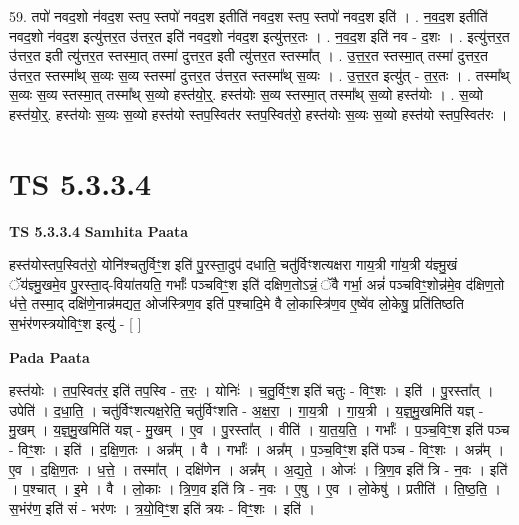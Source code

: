 \documentclass[17pt]{extarticle}
\begin{document}
59. तपो॑ नवद॒शो न॑वद॒श स्तप॒ स्तपो॑ नवद॒श इतीति॑ नवद॒श स्तप॒ स्तपो॑ नवद॒श इति॑ । . न॒व॒द॒श इतीति॑ नवद॒शो न॑वद॒श इत्यु॑त्तर॒त उ॑त्तर॒त इति॑ नवद॒शो न॑वद॒श इत्यु॑त्तर॒तः । . न॒व॒द॒श इति॑ नव - द॒शः । . इत्यु॑त्तर॒त उ॑त्तर॒त इती त्यु॑त्तर॒त स्तस्मा॒त् तस्मा॑ दुत्तर॒त इती त्यु॑त्तर॒त स्तस्मा᳚त् । . उ॒त्त॒र॒त स्तस्मा॒त् तस्मा॑ दुत्तर॒त उ॑त्तर॒त स्तस्मा᳚थ् स॒व्यः स॒व्य स्तस्मा॑ दुत्तर॒त उ॑त्तर॒त स्तस्मा᳚थ् स॒व्यः । . उ॒त्त॒र॒त इत्यु॑त् - त॒र॒तः । . तस्मा᳚थ् स॒व्यः स॒व्य स्तस्मा॒त् तस्मा᳚थ् स॒व्यो हस्त॑यो॒र्॒. हस्त॑योः स॒व्य स्तस्मा॒त् तस्मा᳚थ् स॒व्यो हस्त॑योः । . स॒व्यो हस्त॑यो॒र्॒. हस्त॑योः स॒व्यः स॒व्यो हस्त॑यो स्तप॒स्वित॑र स्तप॒स्वित॑रो॒ हस्त॑योः स॒व्यः स॒व्यो हस्त॑यो स्तप॒स्वित॑रः । \newline
\pagebreak
{}

\section{ TS 5.3.3.4 }

\textbf{TS 5.3.3.4 } \newline
\textbf{Samhita Paata} \newline

हस्त॑योस्तप॒स्वित॑रो॒ योनि॑श्चतुर्विꣳ॒॒श इति॑ पु॒रस्ता॒दुप॑ दधाति॒ चतु॑र्विꣳशत्यक्षरा गाय॒त्री गा॑य॒त्री य॑ज्ञ्मु॒खं ॅय॑ज्ञ्मु॒खमे॒व पु॒रस्ता॒द्-विया॑तयति॒ गर्भाः᳚ पञ्चविꣳ॒॒श इति॑ दक्षिण॒तोऽन्नं॒ ॅवै गर्भा॒ अन्नं॑ पञ्चविꣳ॒॒शोन्न॑मे॒व द॑क्षिण॒तो ध॑त्ते॒ तस्मा॒द् दक्षि॑णे॒नान्न॑मद्यत॒ ओज॑स्त्रिण॒व इति॑ प॒श्चादि॒मे वै लो॒कास्त्रि॑ण॒व ए॒ष्वे॑व लो॒केषु॒ प्रति॑तिष्ठति स॒भंर॑णस्त्रयोविꣳ॒॒श इत्यु॑ - [  ] \newline

\textbf{Pada Paata} \newline

हस्त॑योः । त॒प॒स्वित॑र॒ इति॑ तप॒स्वि - त॒रः॒ । योनिः॑ । च॒तु॒र्विꣳ॒॒श इति॑ चतुः - विꣳ॒॒शः । इति॑ । पु॒रस्ता᳚त् । उपेति॑ । द॒धा॒ति॒ । चतु॑र्विꣳशत्यक्ष॒रेति॒ चतु॑र्विꣳशति - अ॒क्ष॒रा॒ । गा॒य॒त्री । गा॒य॒त्री । य॒ज्ञ्॒मु॒खमिति॑ यज्ञ् - मु॒खम् । य॒ज्ञ्॒मु॒खमिति॑ यज्ञ् - मु॒खम् । ए॒व । पु॒रस्ता᳚त् । वीति॑ । या॒त॒य॒ति॒ । गर्भाः᳚ । प॒ञ्च॒विꣳ॒॒श इति॑ पञ्च - विꣳ॒॒शः । इति॑ । द॒क्षि॒ण॒तः । अन्न᳚म् । वै । गर्भाः᳚ । अन्न᳚म् । प॒ञ्च॒विꣳ॒॒श इति॑ पञ्च - विꣳ॒॒शः । अन्न᳚म् । ए॒व । द॒क्षि॒ण॒तः । ध॒त्ते॒ । तस्मा᳚त् । दक्षि॑णेन । अन्न᳚म् । अ॒द्य॒ते॒ । ओजः॑ । त्रि॒ण॒व इति॑ त्रि - न॒वः । इति॑ । प॒श्चात् । इ॒मे । वै । लो॒काः । त्रि॒ण॒व इति॑ त्रि - न॒वः । ए॒षु । ए॒व । लो॒केषु॑ । प्रतीति॑ । ति॒ष्ठ॒ति॒ । स॒भंर॑ण॒ इति॑ सं - भर॑णः । त्र॒यो॒विꣳ॒॒श इति॑ त्रयः - विꣳ॒॒शः । इति॑ ।  \newline
\end{document}
